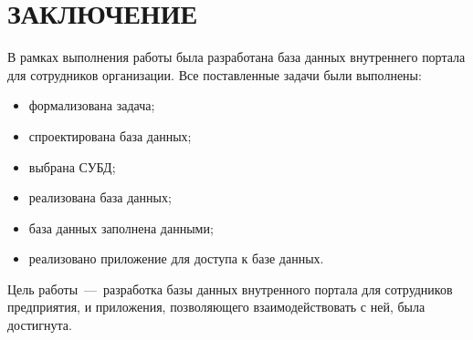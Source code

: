 \chapter*{ЗАКЛЮЧЕНИЕ}

В рамках выполнения работы была разработана база данных внутреннего портала для сотрудников организации. Все поставленные задачи были выполнены:

\begin{itemize}
	\item формализована задача;
	\item спроектирована база данных;
	\item выбрана СУБД;
	\item реализована база данных;
	\item база данных заполнена данными;
	\item реализовано приложение для доступа к базе данных.
\end{itemize}

Цель работы~---~разработка базы данных внутренного портала для сотрудников предприятия, и приложения, позволяющего взаимодействовать с ней, была достигнута.